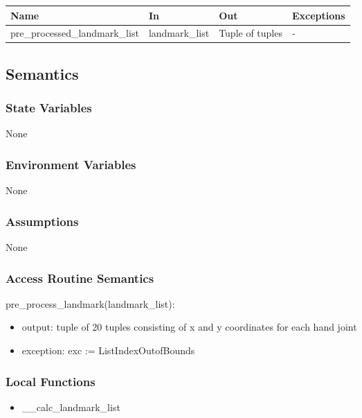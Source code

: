 \documentclass[12pt, titlepage]{article}
\begin{document}
\begin{center}
\begin{tabular}{p{5cm} p{3cm} p{3cm} p{4cm}}
\hline
\textbf{Name} & \textbf{In} & \textbf{Out} & \textbf{Exceptions} \\
\hline
pre\_processed\_landmark\_list & landmark\_list & Tuple of tuples & - \\
\hline
\end{tabular}
\end{center}

\subsection{Semantics}

\subsubsection{State Variables}

None

\subsubsection{Environment Variables}

None

\subsubsection{Assumptions}

None

\subsubsection{Access Routine Semantics}

\noindent pre\_process\_landmark(landmark\_list):
\begin{itemize}
\item output: tuple of 20 tuples consisting of x and y coordinates for each hand joint
\item exception: exc := ListIndexOutofBounds
\end{itemize}

\subsubsection{Local Functions}
\begin{itemize}
\item \_\_calc\_landmark\_list
\end{itemize}
\end{document}
